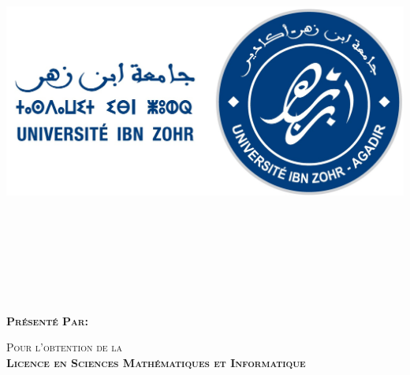 \begin{titlepage}
  \begin{rmfamily}
    \begin{center}


      \includegraphics[scale=0.60]{assets/UIZ.jpg}~\\[0.7cm]
      \textsc{
        \Large \bfseries \UIZ{}\\
      }
      \textsc{
        \FSA{}\\[0.7cm]
      }

      \textsc{
        \Large \bfseries \studyDepartment{}\\[0.4cm]
      }
      \textsc{
        \large \filiere{}\\[0.7cm]
      }
      \textsc{
        \large \reportTitle{}\\[0.5cm]
      }
      \begin{minipage}{0.5\textwidth}
        \begin{center} \normalsize \bfseries
          \textsc{Présenté Par:}
          \textsc{
            \reportAuthor{}
          }\\[0.7cm]

        \end{center}
      \end{minipage}

      \textsc{ Pour l’obtention de la \\
        \bfseries \large Licence en Sciences Mathématiques et Informatique }\\[1cm]

      \HRule \\[0.4cm]
      { \huge \bfseries \reportSubject \\[0.4cm] }


\end{center}
\end{rmfamily}
\end{titlepage}
